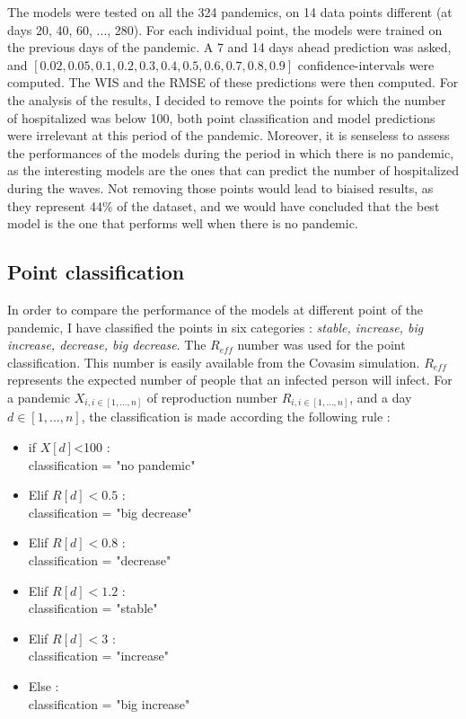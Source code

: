 The models were tested on all the 324 pandemics, on 14 data points different (at days 20, 40, 60, ..., 280). 
For each individual point, the models were trained on the previous days of the pandemic. 
A 7 and 14 days ahead prediction was asked, and $[0.02, 0.05, 0.1, 0.2, 0.3, 0.4, 0.5, 0.6, 0.7, 0.8, 0.9]$ confidence-intervals were computed. 
The WIS and the RMSE of these predictions were then computed. 
For the analysis of the results, I decided to remove the points for which the number of hospitalized was below 100, both point classification and model predictions were irrelevant at this period of the pandemic.
Moreover, it is senseless to assess the performances of the models during the period in which there is no pandemic, as the interesting models are the ones that can predict the number of hospitalized during the waves.
Not removing those points would lead to biaised results, as they represent 44\% of the dataset, and we would have concluded that the best model is the one that performs well when there is no pandemic. 
\subsection{Point classification}
\label{sec:classification}

In order to compare the performance of the models at different point of the pandemic, I have  classified the points in six categories : \textit{stable, increase, big increase, decrease, big decrease}.
The $R_{eff}$ number was used for the point classification. 
This number is easily available from the Covasim simulation. 
$R_{eff}$ represents the expected number of people that an infected person will infect.
For a pandemic $X_{i, i \in [1, ..., n]}$ of reproduction number $R_{i, i \in [1, ..., n]}$, and a day $d \in [1, \hdots, n]$, the classification is made according the following rule : \\
\begin{itemize}
    \item if $X[d]$<100 : \\
    classification = "no pandemic"
    \item Elif $R[d] <0.5$ : \\
    classification = "big decrease"
    \item Elif $R[d] < 0.8$ : \\
    classification = "decrease"
    \item Elif $R[d] < 1.2$ : \\
    classification = "stable" 
    \item Elif $R[d] < 3$ : \\
    classification = "increase"
    \item Else : \\
    classification = "big increase"
\end{itemize}


